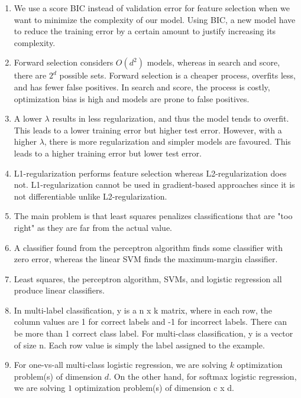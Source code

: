 \documentclass{article}
\def\enum#1{\begin{enumerate}#1\end{enumerate}}
\begin{document}
\enum{
\item We use a score BIC instead of validation error for feature selection when we want to minimize the complexity of our model. Using BIC, a new model have to reduce the training error by a certain amount to justify increasing its complexity.
\item Forward selection considers $O(d^2)$ models, whereas in search and score, there are $2^d$ possible sets. Forward selection is a cheaper process, overfits less, and has fewer false positives. In search and score, the process is costly, optimization bias is high and models are prone to false positives. 
\item A lower $\lambda$ results in less regularization, and thus the model tends to overfit. This leads to a lower training error but higher test error. However, with a higher $\lambda$, there is more regularization and simpler models are favoured. This leads to a higher training error but lower test error.
\item L1-regularization performs feature selection whereas L2-regularization does not. L1-regularization cannot be used in gradient-based approaches since it is not differentiable unlike L2-regularization.
\item The main problem is that least squares penalizes classifications that are "too right" as they are far from the actual value.
\item A classifier found from the perceptron algorithm finds some classifier with zero error, whereas the linear SVM finds the maximum-margin classifier.
\item Least squares, the perceptron algorithm, SVMs, and logistic regression all produce linear classifiers.
\item In multi-label classification, y is a n x k matrix, where in each row, the column values are 1 for correct labels and -1 for incorrect labels. There can be more than 1 correct class label. For multi-class classification, y is a vector of size n. Each row value is simply the label assigned to the example.
\item For one-vs-all multi-class logistic regression, we are solving $k$ optimization problem(s) of dimension $d$. On the other hand, for softmax logistic regression, we are solving $1$ optimization problem(s) of dimension c x d.
}
\end{document}
